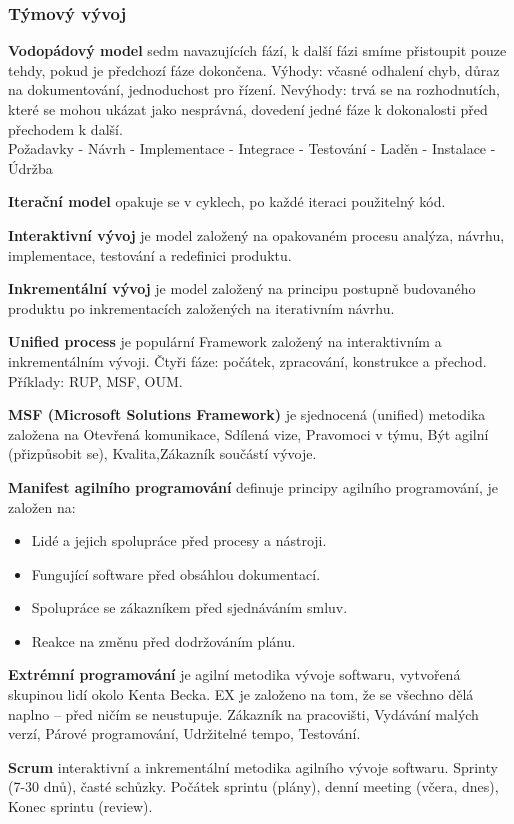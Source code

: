 \subsubsection{Týmový vývoj}
\textbf{Vodopádový model} sedm navazujících fází, k další fázi smíme přistoupit pouze tehdy, pokud je předchozí fáze dokončena. Výhody: včasné odhalení chyb, důraz na dokumentování, jednoduchost pro řízení. Nevýhody: trvá se na rozhodnutích, které se mohou ukázat jako nesprávná, dovedení jedné fáze k dokonalosti před přechodem k další.\\
Požadavky - Návrh - Implementace - Integrace - Testování - Laděn - Instalace - Údržba

\textbf{Iterační model} opakuje se v cyklech, po každé iteraci použitelný kód.

\textbf{Interaktivní vývoj} je model založený na opakovaném procesu analýza, návrhu, implementace, testování a redefinici produktu.

\textbf{Inkrementální vývoj} je model založený na principu postupně budovaného produktu po inkrementacích založených na iterativním návrhu.

\textbf{Unified process} je populární Framework založený na interaktivním a inkrementálním vývoji. Čtyři fáze: počátek, zpracování, konstrukce a přechod. Příklady: RUP, MSF, OUM.

\textbf{MSF (Microsoft Solutions Framework)} je sjednocená (unified) metodika založena na Otevřená komunikace, Sdílená vize, Pravomoci v týmu, Být agilní (přizpůsobit se), Kvalita,Zákazník součástí vývoje.

\textbf{Manifest agilního programování} definuje principy agilního programování, je založen na:
\begin{itemize}
\item Lidé a jejich spolupráce před procesy a nástroji.
\item Fungující software před obsáhlou dokumentací.
\item Spolupráce se zákazníkem před sjednáváním smluv.
\item Reakce na změnu před dodržováním plánu.
\end{itemize}

\textbf{Extrémní programování} je agilní metodika vývoje softwaru, vytvořená skupinou lidí okolo Kenta Becka. EX je založeno na tom, že se všechno dělá naplno – před ničím se neustupuje. Zákazník na pracovišti, Vydávání malých verzí, Párové programování, Udržitelné tempo, Testování.

\textbf{Scrum} interaktivní a inkrementální metodika agilního vývoje softwaru. Sprinty (7-30 dnů), časté schůzky. Počátek sprintu (plány), denní meeting (včera, dnes), Konec sprintu (review).

